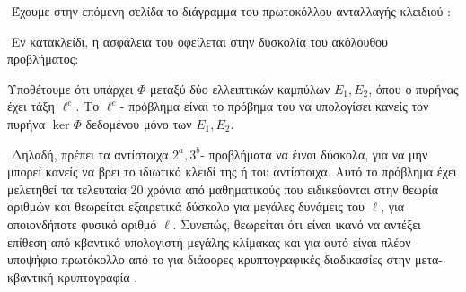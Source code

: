 \documentclass[oneside,a4paper]{article}
\begin{document}
$ $\newline
Έχουμε στην επόμενη σελίδα το διάγραμμα του πρωτοκόλλου ανταλλαγής κλειδιού :



$ $\newline
Εν κατακλείδι, η ασφάλεια του  οφείλεται στην δυσκολία του ακόλουθου προβλήματος:
\vspace*{0.3cm}
\begin{defn}
	Υποθέτουμε ότι υπάρχει  $\Phi$ μεταξύ δύο ελλειπτικών καμπύλων $E_1, E_2$, όπου ο πυρήνας έχει τάξη $\ell^e$. Το $\ell^e$- πρόβλημα είναι το πρόβημα του να υπολογίσει κανείς τον πυρήνα $\ker \Phi$ δεδομένου μόνο των $E_1, E_2$.
\end{defn}
\vspace*{0.5cm}

$ $\newline
Δηλαδή, πρέπει τα αντίστοιχα $2^a,3^b$- προβλήματα να έιναι δύσκολα, για να μην μπορεί κανείς να βρει το ιδιωτικό κλειδί της  ή του  αντίστοιχα. Αυτό το πρόβλημα έχει μελετηθεί τα τελευταία 20 χρόνια από μαθηματικούς που ειδικεύονται στην θεωρία αριθμών και θεωρείται εξαιρετικά δύσκολο για μεγάλες δυνάμεις του $\ell$, για οποιονδήποτε φυσικό αριθμό $\ell$. Συνεπώς, θεωρείται ότι είναι ικανό να αντέξει επίθεση από κβαντικό υπολογιστή μεγάλης κλίμακας και για αυτό είναι πλέον υποψήφιο πρωτόκολλο από το  για διάφορες κρυπτογραφικές διαδικασίες στην μετα-κβαντική κρυπτογραφία \cite{nistquantum}.
\end{document}
